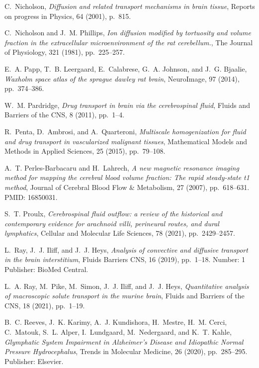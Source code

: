 \documentclass[10pt,letterpaper]{article}
\newcommand{\1}{^{(1)}}
\newcommand{\2}{^{(2)}}
\begin{document}
\begin{thebibliography}{10}
{\sc C.~Nicholson}, {\em Diffusion and related transport mechanisms in brain
  tissue}, Reports on progress in Physics, 64 (2001), p.~815.

{\sc C.~Nicholson and J.~M. Phillips}, {\em Ion diffusion modified by
  tortuosity and volume fraction in the extracellular microenvironment of the
  rat cerebellum.}, The Journal of Physiology, 321 (1981), pp.~225--257.

{\sc E.~A. Papp, T.~B. Leergaard, E.~Calabrese, G.~A. Johnson, and J.~G.
  Bjaalie}, {\em Waxholm space atlas of the sprague dawley rat brain},
  {NeuroImage}, 97 (2014), pp.~374--386.

{\sc W.~M. Pardridge}, {\em Drug transport in brain via the cerebrospinal
  fluid}, Fluids and Barriers of the CNS, 8 (2011), pp.~1--4.

{\sc R.~Penta, D.~Ambrosi, and A.~Quarteroni}, {\em Multiscale homogenization
  for fluid and drug transport in vascularized malignant tissues}, Mathematical
  Models and Methods in Applied Sciences, 25 (2015), pp.~79--108.

{\sc A.~T. Perles-Barbacaru and H.~Lahrech}, {\em A new magnetic resonance
  imaging method for mapping the cerebral blood volume fraction: The rapid
  steady-state t1 method}, Journal of Cerebral Blood Flow \& Metabolism, 27
  (2007), pp.~618--631.
\newblock PMID: 16850031.

{\sc S.~T. Proulx}, {\em Cerebrospinal fluid outflow: a review of the
  historical and contemporary evidence for arachnoid villi, perineural routes,
  and dural lymphatics}, Cellular and Molecular Life Sciences, 78 (2021),
  pp.~2429--2457.

{\sc L.~Ray, J.~J. Iliff, and J.~J. Heys}, {\em Analysis of convective and
  diffusive transport in the brain interstitium}, Fluids Barriers CNS, 16
  (2019), pp.~1--18.
\newblock Number: 1 Publisher: BioMed Central.

{\sc L.~A. Ray, M.~Pike, M.~Simon, J.~J. Iliff, and J.~J. Heys}, {\em
  Quantitative analysis of macroscopic solute transport in the murine brain},
  Fluids and Barriers of the CNS, 18 (2021), pp.~1--19.

{\sc B.~C. Reeves, J.~K. Karimy, A.~J. Kundishora, H.~Mestre, H.~M. Cerci,
  C.~Matouk, S.~L. Alper, I.~Lundgaard, M.~Nedergaard, and K.~T. Kahle}, {\em
  Glymphatic {System} {Impairment} in {Alzheimer}’s {Disease} and
  {Idiopathic} {Normal} {Pressure} {Hydrocephalus}}, Trends in Molecular
  Medicine, 26 (2020), pp.~285--295.
\newblock Publisher: Elsevier.


\end{thebibliography}
\end{document}
